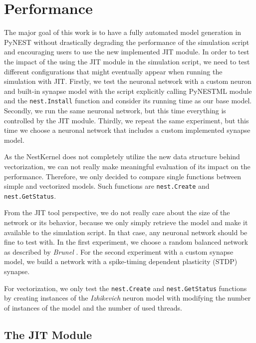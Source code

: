 \chapter{Performance}
 \label{chap:perf}
 
 The major goal of this work is to have a fully automated model generation in PyNEST without drastically degrading the performance of the simulation script and encouraging users to use the new implemented JIT module. In order to test the impact of the using the JIT module in the simulation script, we need to test different configurations that might eventually appear when running the simulation with JIT. Firstly, we test the neuronal network with a custom neuron and built-in synapse model with the script explicitly calling PyNESTML module and the \texttt{nest.Install} function and  consider its running time as our base model. Secondly, we run the same neuronal network, but this time everything is controlled by the JIT module. Thirdly, we repeat the same experiment, but this time we choose a neuronal network that includes a custom implemented synapse model.
 
 As the NestKernel does not completely utilize the new data structure behind vectorization, we can not really make meaningful evaluation of its impact on the performance. Therefore, we only decided to compare single functions between simple and vectorized models. Such functions are \texttt{nest.Create} and \texttt{nest.GetStatus}.
 
 From the JIT tool perspective, we do not really care about the size of the network or its behavior, because we only simply retrieve the model and make it available to the simulation script. In that case, any neuronal network should be fine to test with. In the first experiment, we choose a random balanced network as  described by \emph{Brunel} \citep{brunel2000dynamics}. For the second experiment with a custom synapse model, we build a network with a spike-timing dependent plasticity (STDP) synapse.
 
 
 For vectorization, we only test the \texttt{nest.Create} and \texttt{nest.GetStatus} functions by creating instances of the \emph{Izhikevich} \citep{1257420} neuron model with modifying the number of instances of the model and the number of used threads.
 
\section{The JIT Module}

